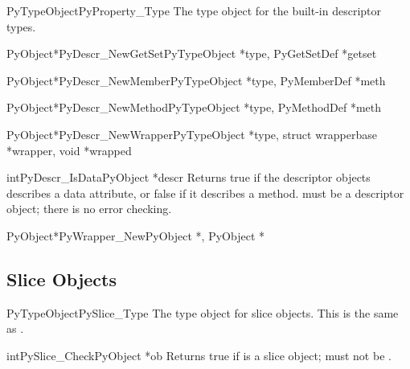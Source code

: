 \begin{cvardesc}{PyTypeObject}{PyProperty_Type}
  The type object for the built-in descriptor types.
\end{cvardesc}

\begin{cfuncdesc}{PyObject*}{PyDescr_NewGetSet}{PyTypeObject *type,
					        PyGetSetDef *getset}
\end{cfuncdesc}

\begin{cfuncdesc}{PyObject*}{PyDescr_NewMember}{PyTypeObject *type,
					        PyMemberDef *meth}
\end{cfuncdesc}

\begin{cfuncdesc}{PyObject*}{PyDescr_NewMethod}{PyTypeObject *type,
                                                PyMethodDef *meth}
\end{cfuncdesc}

\begin{cfuncdesc}{PyObject*}{PyDescr_NewWrapper}{PyTypeObject *type,
						 struct wrapperbase *wrapper,
                                                 void *wrapped}
\end{cfuncdesc}

\begin{cfuncdesc}{int}{PyDescr_IsData}{PyObject *descr}
  Returns true if the descriptor objects  describes a data
  attribute, or false if it describes a method.   must be a
  descriptor object; there is no error checking.
\end{cfuncdesc}

\begin{cfuncdesc}{PyObject*}{PyWrapper_New}{PyObject *, PyObject *}
\end{cfuncdesc}


\subsection{Slice Objects \label{slice-objects}}

\begin{cvardesc}{PyTypeObject}{PySlice_Type}
  The type object for slice objects.  This is the same as
  .
\end{cvardesc}

\begin{cfuncdesc}{int}{PySlice_Check}{PyObject *ob}
  Returns true if  is a slice object;  must not be
  \NULL.
\end{cfuncdesc}

